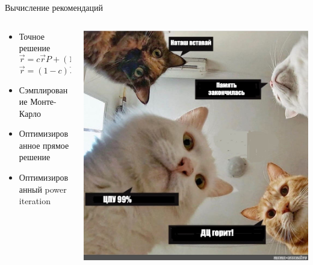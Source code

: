 \documentclass[11pt,aspectratio=169,handout]{beamer}
\begin{document}
\begin{frame}{Вычисление рекомендаций}

\begin{columns}

\begin{column}{0.5\textwidth}
\begin{itemize}[<+->]
\item Точное решение
\[
\vec{r} = c \vec{r} P + (1 - c) \vec{s} \quad \Rightarrow \quad
\]
\[
\vec{r} = (1 - c) \vec{s} \left(I - c P \right)^{-1}
\]
\item Сэмплирование Монте-Карло
\item Оптимизированное прямое решение
\item Оптимизированный power iteration
\end{itemize}
\end{column}

\begin{column}{0.4\textwidth}
\begin{center}
\includegraphics[scale=0.2]{images/natash.jpeg}
\end{center}
\end{column}

\end{columns}

\end{frame}
\end{document}
